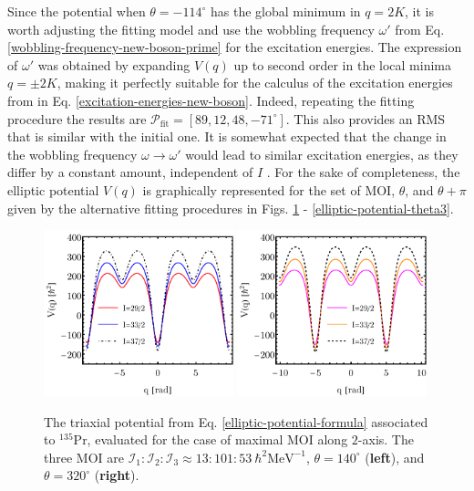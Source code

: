 Since the potential when $\theta=-114^\circ$ has the global minimum in $q=2K$, it is worth adjusting the fitting model and use the wobbling frequency $\omega'$ from Eq. \ref{wobbling-frequency-new-boson-prime} for the excitation energies. The expression of $\omega'$ was obtained by expanding $V(q)$ up to second order in the local minima $q=\pm 2K$, making it perfectly suitable for the calculus of the excitation energies from in Eq. \ref{excitation-energies-new-boson}. Indeed, repeating the fitting procedure the results are $\mathcal{P}_\text{fit}=\left[89,12,48,-71^\circ\right]$. This also provides an RMS that is similar with the initial one. It is somewhat expected that the change in the wobbling frequency $\omega\rightarrow\omega'$ would lead to similar excitation energies, as they differ by a constant amount, independent of $I$ \cite{raduta2020new}. For the sake of completeness, the elliptic potential $V(q)$ is graphically represented for the set of MOI, $\theta$, and $\theta+\pi$ given by the alternative fitting procedures in Figs. \ref{elliptic-potential-theta2} - \ref{elliptic-potential-theta3}.
\begin{figure}
    \centering
    \includegraphics[width=0.49\textwidth]{Chapters/Figures/potential-fit2-theta.pdf}
    \includegraphics[width=0.49\textwidth]{Chapters/Figures/potential-fit2-theta-pi.pdf}
    \caption{The triaxial potential from Eq. \ref{elliptic-potential-formula} associated to $^{135}$Pr, evaluated for the case of maximal MOI along $2$-axis. The three MOI are $\mathcal{I}_1:\mathcal{I}_2:\mathcal{I}_3\approx13:101:53\ \hbar^2\text{MeV}^{-1}$, $\theta=140^\circ$ (\textbf{left}), and $\theta=320^\circ$ (\textbf{right}).}
    \label{elliptic-potential-theta2}
\end{figure}
